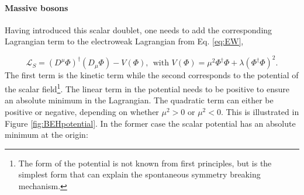 \paragraph{Massive bosons}
Having introduced this scalar doublet, one needs to add the corresponding Lagrangian term to the electroweak Lagrangian from Eq. \ref{eq:EW}, 

\begin{equation}
\label{eq:higgslagrangian}
\mathcal{L}_S = \left(D^\mu\Phi\right)^\dagger \left(D_\mu \Phi\right) - V\left(\Phi\right), \ \ \textrm{with } V\left(\Phi\right) = \mu^2 \Phi^\dagger\Phi + \lambda \left(\Phi^\dagger \Phi\right)^2. 
\end{equation}
\noindent The first term is the kinetic term while the second corresponds to the potential of the scalar field\footnote{The form of the potential is not known from first principles, but is the simplest form that can explain the spontaneous symmetry breaking mechanism.}. The linear term in the potential needs to be positive to ensure an absolute minimum in the Lagrangian. The quadratic term can either be positive or negative, depending on whether $\mu^2 > 0$ or $\mu^2 < 0$. This is illustrated in Figure \ref{fig:BEHpotential}. In the former case the scalar potential has an absolute minimum at the origin:

